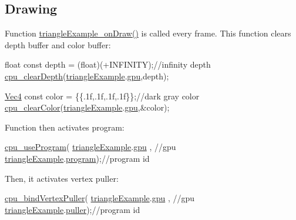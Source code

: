 \hypertarget{triangleExample.c_Drawing}{}\subsection{Drawing}\label{triangleExample.c_Drawing}
Function \hyperlink{triangleExample_8c_adad04513776893b55b58aa0e8a84b8df}{triangle\+Example\+\_\+on\+Draw()} is called every frame. This function clears depth buffer and color buffer\+: 
\begin{DoxyCodeInclude}
  \textcolor{keywordtype}{float} \textcolor{keyword}{const} depth = (float)(+INFINITY);\textcolor{comment}{//infinity depth}
  \hyperlink{gpu_8h_a988bd18047695141224acfbd2abbe246}{cpu\_clearDepth}(\hyperlink{triangleExample_8c_af82b723635ac0c90962571915a1b1163}{triangleExample}.\hyperlink{structTriangleExampleVariables_a6c5c3f82065ae9aac07f9e6f11dd03b3}{gpu},depth);

  \hyperlink{structVec4}{Vec4} \textcolor{keyword}{const} color = \{\{.1f,.1f,.1f,.1f\}\};\textcolor{comment}{//dark gray color}
  \hyperlink{gpu_8h_ac8b73f65bb746147b136819e862785ce}{cpu\_clearColor}(\hyperlink{triangleExample_8c_af82b723635ac0c90962571915a1b1163}{triangleExample}.\hyperlink{structTriangleExampleVariables_a6c5c3f82065ae9aac07f9e6f11dd03b3}{gpu},&color);
\end{DoxyCodeInclude}
Function then activates program\+: 
\begin{DoxyCodeInclude}
  \hyperlink{program_8h_a497d97730640942bffcc3cd9f266f146}{cpu\_useProgram}(
      \hyperlink{triangleExample_8c_af82b723635ac0c90962571915a1b1163}{triangleExample}.\hyperlink{structTriangleExampleVariables_a6c5c3f82065ae9aac07f9e6f11dd03b3}{gpu}    , \textcolor{comment}{//gpu}
      \hyperlink{triangleExample_8c_af82b723635ac0c90962571915a1b1163}{triangleExample}.\hyperlink{structTriangleExampleVariables_aabf788228d2e91e2718facfbd911c8cc}{program});\textcolor{comment}{//program id}
\end{DoxyCodeInclude}
Then, it activates vertex puller\+: 
\begin{DoxyCodeInclude}
  \hyperlink{vertexPuller_8h_a27eee6237125ddc21c7d9b996f5af84e}{cpu\_bindVertexPuller}(
      \hyperlink{triangleExample_8c_af82b723635ac0c90962571915a1b1163}{triangleExample}.\hyperlink{structTriangleExampleVariables_a6c5c3f82065ae9aac07f9e6f11dd03b3}{gpu}   , \textcolor{comment}{//gpu}
      \hyperlink{triangleExample_8c_af82b723635ac0c90962571915a1b1163}{triangleExample}.\hyperlink{structTriangleExampleVariables_a82e39dd0d18fc57422686229d801e39f}{puller});\textcolor{comment}{//program id}
\end{DoxyCodeInclude}
